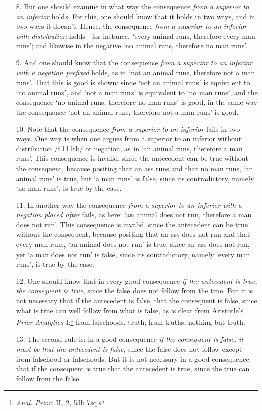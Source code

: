 \documentclass[]{article}
\begin{document}
\begin{enumerate}
\item[8.] But one should examine in what way the consequence \textit{from a superior to an inferior} holds. For this, one should know that it holds in two ways, and in two ways it doesn't. Hence, the consequence \textit{from a superior to an inferior with distribution} holds - for instance, `every animal runs, therefore every man runs'; and likewise in the negative `no animal runs, therefore no man runs'.
\item[9.] And one should know that the consequence \textit{from a superior to an inferior with a negation prefixed} holds, as in `not an animal runs, therefore not a man runs'. That this is good is shown: since `not an animal runs' is equivalent to `no animal runs', and `not a man runs' is equivalent to `no man runs', and the consequence `no animal runs, therefore no man runs' is good, in the same way the consequence `not an animal runs, therefore not a man runs' is good.
\item[10.] Note that the consequence \textit{from a superior to an inferior} fails in two ways. One way is when one argues from a superior to an inferior without distribution /f.111rb/ or negation, as in `an animal runs, therefore a man runs'. This consequence is invalid, since the antecedent can be true without the consequent, because positing that an ass runs and that no man runs, `an animal runs' is true, but `a man runs' is false, since its contradictory, namely `no man runs', is true by the case.
\item[11.] In another way the consequence \textit{from a superior to an inferior with a negation placed after} fails, as here: `an animal does not run, therefore a man does not run'. This consequence is invalid, since the antecedent can be true without the consequent, because positing that an ass does not run and that every man runs, `an animal does not run' is true, since an ass does not run, yet `a man does not run' is false, since its contradictory, namely `every man runs', is true by the case.
\item[12.] One should know that in every good consequence \textit{if the antecedent is true, the consequent is true}, since the false does not follow from the true. But it is not necessary that if the antecedent is false, that the consequent is false, since what is true can well follow from what is false, as is clear from Aristotle's \textit{Prior Analytics} I:\footnote{\textit{Anal. Prior.} II, 2, 53b 7sq.} from falsehoods, truth; from truths, nothing but truth.
\item[13.] The second rule is: in a good consequence \textit{if the consequent is false, it must be that the antecedent is false}, since the false does not follow except from falsehood or falsehoods. But it is not necessary in a good consequence that if the consequent is true that the antecedent is true, since the true can follow from the false.

\end{enumerate}
\end{document}
